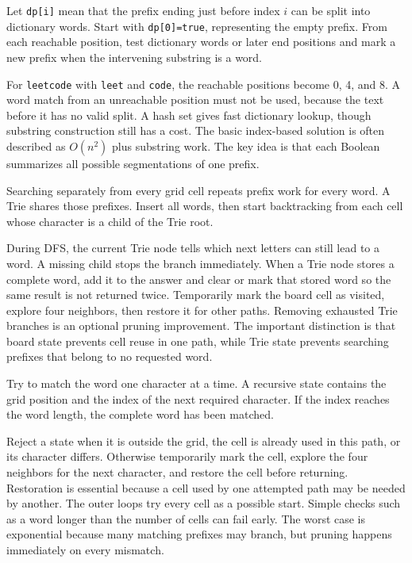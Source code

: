 \expandafter\def\csname sourcewalkthrough@68\endcsname{%
Let \texttt{dp[i]} mean that the prefix ending just before index \(i\) can be
split into dictionary words. Start with \texttt{dp[0]=true}, representing the
empty prefix. From each reachable position, test dictionary words or later end
positions and mark a new prefix when the intervening substring is a word.

For \texttt{leetcode} with \texttt{leet} and \texttt{code}, the reachable
positions become 0, 4, and 8. A word match from an unreachable position must
not be used, because the text before it has no valid split. A hash set gives
fast dictionary lookup, though substring construction still has a cost. The
basic index-based solution is often described as \(O(n^2)\) plus substring
work. The key idea is that each Boolean summarizes all possible segmentations
of one prefix.}

\expandafter\def\csname sourcewalkthrough@69\endcsname{%
Searching separately from every grid cell repeats prefix work for every word.
A Trie shares those prefixes. Insert all words, then start backtracking from
each cell whose character is a child of the Trie root.

During DFS, the current Trie node tells which next letters can still lead to a
word. A missing child stops the branch immediately. When a Trie node stores a
complete word, add it to the answer and clear or mark that stored word so the
same result is not returned twice. Temporarily mark the board cell as visited,
explore four neighbors, then restore it for other paths. Removing exhausted
Trie branches is an optional pruning improvement. The important distinction is
that board state prevents cell reuse in one path, while Trie state prevents
searching prefixes that belong to no requested word.}

\expandafter\def\csname sourcewalkthrough@70\endcsname{%
Try to match the word one character at a time. A recursive state contains the
grid position and the index of the next required character. If the index
reaches the word length, the complete word has been matched.

Reject a state when it is outside the grid, the cell is already used in this
path, or its character differs. Otherwise temporarily mark the cell, explore
the four neighbors for the next character, and restore the cell before
returning. Restoration is essential because a cell used by one attempted path
may be needed by another. The outer loops try every cell as a possible start.
Simple checks such as a word longer than the number of cells can fail early.
The worst case is exponential because many matching prefixes may branch, but
pruning happens immediately on every mismatch.}

